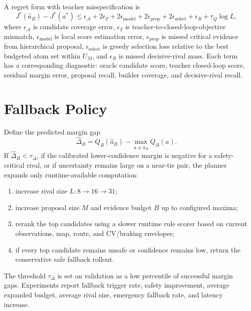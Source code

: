 \documentclass{article}
\newcommand{\A}{\mathcal{A}}
\begin{document}
A regret form with teacher misspecification is
\begin{equation}
J^*(\hat a_B)-J^*(a^*)
\le
\epsilon_{\A}
+2\epsilon_T
+2\epsilon_{\mathrm{model}}
+2\epsilon_{\mathrm{prop}}
+2\epsilon_{\mathrm{select}}
+\epsilon_R
+\tau_Q\log L,
\end{equation}
where $\epsilon_{\A}$ is candidate coverage error, $\epsilon_T$ is teacher-to-closed-loop-objective mismatch, $\epsilon_{\mathrm{model}}$ is local score estimation error, $\epsilon_{\mathrm{prop}}$ is missed critical evidence from hierarchical proposal, $\epsilon_{\mathrm{select}}$ is greedy selection loss relative to the best budgeted atom set within $U_M$, and $\epsilon_R$ is missed decisive-rival mass. Each term has a corresponding diagnostic: oracle candidate score, teacher closed-loop score, residual margin error, proposal recall, builder coverage, and decisive-rival recall.

\section{Fallback Policy}
\label{app:fallback}

Define the predicted margin gap
\begin{equation}
    \hat\Delta_B=Q_B(\hat a_B)-\max_{a\ne\hat a_B}Q_B(a).
\end{equation}
If $\hat\Delta_B<\tau_\Delta$, if the calibrated lower-confidence margin is negative for a safety-critical rival, or if uncertainty remains large on a near-tie pair, the planner expands only runtime-available computation:
\begin{enumerate}[leftmargin=*]
    \item increase rival size $L:8\rightarrow16\rightarrow31$;
    \item increase proposal size $M$ and evidence budget $B$ up to configured maxima;
    \item rerank the top candidates using a slower runtime rule scorer based on current observations, map, route, and CV/braking envelopes;
    \item if every top candidate remains unsafe or confidence remains low, return the conservative safe fallback rollout.
\end{enumerate}
The threshold $\tau_\Delta$ is set on validation as a low percentile of successful margin gaps. Experiments report fallback trigger rate, safety improvement, average expanded budget, average rival size, emergency fallback rate, and latency increase.


\printbibliography
\end{document}
